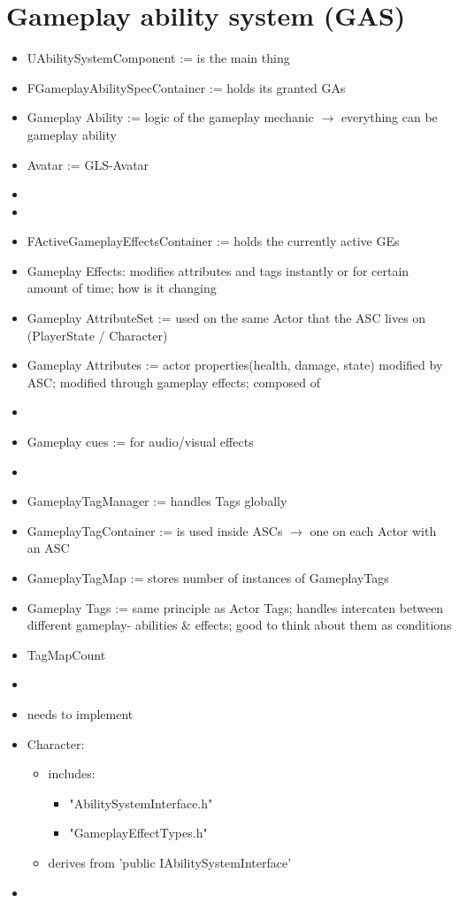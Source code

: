 \chapter{Gameplay ability system (GAS)}
    \begin{itemize}
        \item UAbilitySystemComponent := is the main thing
        \item FGameplayAbilitySpecContainer := holds its granted GAs
        \item Gameplay Ability := logic of the gameplay mechanic $\rightarrow$ everything can be gameplay ability
        \item Avatar := \glsdesc{GLS-Avatar}
        \item 
        \item 
        \item FActiveGameplayEffectsContainer := holds the currently active GEs
        \item Gameplay Effects: modifies attributes and tags instantly or for certain amount of time; how is it changing
        \item Gameplay AttributeSet := used on the same Actor that the ASC lives on (PlayerState / Character)
        \item Gameplay Attributes := actor properties(health, damage, state) modified by ASC; modified through gameplay effects; composed of  
        \item 
        \item Gameplay cues := for audio/visual effects 
        \item 
        \item GameplayTagManager := handles Tags globally
        \item GameplayTagContainer := is used inside ASCs $\rightarrow$ one on each Actor with an ASC
        \item GameplayTagMap := stores number of instances of GameplayTags
        \item Gameplay Tags := same principle as Actor Tags; handles intercaten between different gameplay- abilities \& effects; good to think about them as conditions
        \item TagMapCount
        \item 
        \item needs to implement 
        \item Character:
        \begin{itemize}
            \item includes:
            \begin{itemize}
                \item "AbilitySystemInterface.h"
                \item "GameplayEffectTypes.h"
            \end{itemize}
            \item derives from 'public IAbilitySystemInterface'
        \end{itemize} 
        \item 
    \end{itemize}

